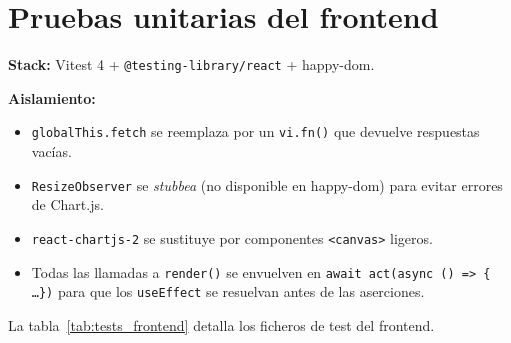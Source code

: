 \documentclass[12pt,twoside,titlepage]{report}
\begin{document}
\section{Pruebas unitarias del frontend}

\textbf{Stack:} Vitest 4 \cite{vitest} + \texttt{@testing-library/react} + happy-dom.

\textbf{Aislamiento:}
\begin{itemize}[nosep]
  \item \texttt{globalThis.fetch} se reemplaza por un \texttt{vi.fn()} que devuelve respuestas vacías.
  \item \texttt{ResizeObserver} se \emph{stubbea} (no disponible en happy-dom) para evitar errores de Chart.js.
  \item \texttt{react-chartjs-2} se sustituye por componentes \texttt{<canvas>} ligeros.
  \item Todas las llamadas a \texttt{render()} se envuelven en \texttt{await act(async () => \{ \ldots \})} para que los \texttt{useEffect} se resuelvan antes de las aserciones.
\end{itemize}

La tabla~\ref{tab:tests_frontend} detalla los ficheros de test del frontend.
\end{document}
